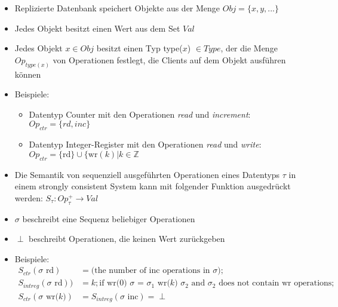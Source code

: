 \documentclass[11pt,a4paper,ngerman]{scrartcl}
\begin{document}
\begin{itemize}
\item Replizierte Datenbank speichert Objekte aus der Menge $Obj = \lbrace x,y,...\rbrace$
\item Jedes Objekt besitzt einen Wert aus dem Set $Val$
\item Jedes Objekt $x \in Obj$ besitzt einen Typ type($x$) $\in Type$, der die Menge $Op_{type(x)}$ von Operationen festlegt, die Clients auf dem Objekt ausführen können
\item Beispiele:
\begin{itemize}
\item Datentyp Counter mit den Operationen \textit{read} und \textit{increment}: $Op_{ctr} = \lbrace rd,inc\rbrace$
\item Datentyp Integer-Register mit den Operationen \textit{read} und \textit{write}: $Op_{ctr} = \lbrace \text{rd}\rbrace \cup \lbrace \text{wr}(k) | k \in \mathbb{Z}$
\end{itemize}
\item Die Semantik von sequenziell ausgeführten Operationen eines Datentyps $\tau$ in einem strongly consistent System kann mit folgender Funktion ausgedrückt werden: $S_{\tau} : Op_{\tau}^+ \rightarrow Val$
\item $\sigma$ beschreibt eine Sequenz beliebiger Operationen
\item $\perp$ beschreibt Operationen, die keinen Wert zurückgeben
\item Beispiele:
\begin{align} 
S_{ctr}(\sigma \text{ rd}) &= \text{(the number of inc operations in $\sigma$);} \\
S_{intreg}(\sigma \text{ rd})) &= k; \text{if wr(0) $\sigma$ = $\sigma_1$ wr($k$) $\sigma_2$ and $\sigma_2$ does not contain wr operations;} \\
S_{ctr}(\sigma \text{ wr($k$)}) &= S_{intreg}(\sigma \text{ inc}) = \perp 
\end{align}

\end{itemize}

\pagebreak
\printglossaries
\end{document}
